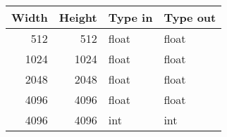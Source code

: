 \begin{tabular}{rrll}
  \toprule
  Width & Height & Type in & Type out \\
  \midrule
  512 & 512 & float & float \\
  1024 & 1024 & float & float \\
  2048 & 2048 & float & float \\
  4096 & 4096 & float & float \\
  4096 & 4096 & int & int \\
  \bottomrule
\end{tabular}

